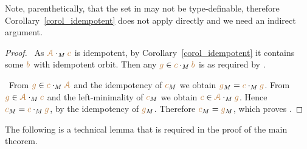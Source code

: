 \documentclass[creche.tex]{subfiles}
\begin{document}
Note, parenthetically, that the set in  may not be type-definable, 
therefore Corollary~\ref{corol_idempotent} does not apply 
directly and we need an indirect argument.

\begin{proof}  \ 
As  ${\color{brown}{\EuScript A}}\cdot_M{\color{brown} c}$ is idempotent, 
by Corollary~\ref{corol_idempotent} it contains some ${\color{brown} b}$ with idempotent orbit.
Then any ${\color{brown} g}\in{\color{brown}c}\cdot_M{\color{brown} b}$ is as required by \ssf{1}.

 \ From ${\color{brown} g}\in{\color{brown}c}\cdot_M{\color{brown}{\EuScript A}}$ and the idempotency of ${\color{brown} c}_M$ 
we obtain ${\color{brown} g}_M={\color{brown} c}\cdot_M{\color{brown} g}$. 
From ${\color{brown} g}\in{\color{brown}{\EuScript A}}\cdot_M{\color{brown} c}$ and the left-minimality of ${\color{brown} c}_M$ we obtain ${\color{brown} c}\in{\color{brown}{\EuScript A}}\cdot_M{\color{brown} g}$. Hence ${\color{brown} c}_M={\color{brown} c}\cdot_M{\color{brown} g}$, by the idempotency of ${\color{brown} g}_M$. Therefore ${\color{brown} c}_M={\color{brown} g}_M$, which proves .
\end{proof}

The following is a technical lemma that is required in the proof of the main theorem.
\end{document}
